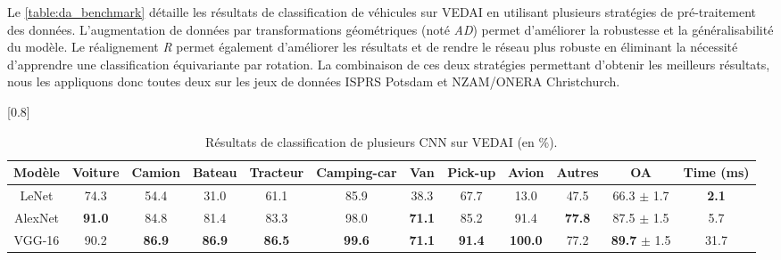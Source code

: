 Le \cref{table:da_benchmark} détaille les résultats de classification de véhicules sur \gls{VEDAI} en utilisant plusieurs stratégies de pré-traitement des données. L'augmentation de données par transformations géométriques (noté \emph{AD}) permet d'améliorer la robustesse et la généralisabilité du modèle. Le réalignement \emph{R} permet également d'améliorer les résultats et de rendre le réseau plus robuste en éliminant la nécessité d'apprendre une classification équivariante par rotation. La combinaison de ces deux stratégies permettant d'obtenir les meilleurs résultats, nous les appliquons donc toutes deux sur les jeux de données \gls{ISPRS} Potsdam et NZAM/ONERA Christchurch.

\begin{table}[t]
\centering
	\caption{Résultats de classification de plusieurs \gls{CNN} sur \gls{VEDAI} (en \%).}
    \label{table:cnn_benchmark}
    \setlength\tabcolsep{3pt}
    \scalebox{0.8}[0.8]{
	\begin{tabular}{cccccccccccc}
    \toprule
    \textbf{Modèle} &  \textbf{Voiture} & \textbf{Camion} & \textbf{Bateau} & \textbf{Tracteur} & \textbf{Camping-car} & \textbf{Van} & \textbf{Pick-up} & \textbf{Avion} & \textbf{Autres} & \textbf{OA} & \textbf{Time (ms)}\\
    \midrule
  LeNet & 74.3 & 54.4 & 31.0 & 61.1 & 85.9 & 38.3 & 67.7 & 13.0 & 47.5 & 66.3 $\pm$ 1.7  & \textbf{2.1}\\
  AlexNet & \textbf{91.0} & 84.8 & 81.4 & 83.3 & 98.0 & \textbf{71.1} & 85.2 & 91.4 & \textbf{77.8} & 87.5 $\pm$ 1.5 & 5.7\\
  VGG-16 & 90.2 & \textbf{86.9} & \textbf{86.9} & \textbf{86.5} & \textbf{99.6} & \textbf{71.1}
& \textbf{91.4} & \textbf{100.0} & 77.2 & \textbf{89.7} $\pm$ 1.5 & 31.7\\
    \bottomrule
  \end{tabular}}
\end{table}
\unskip
